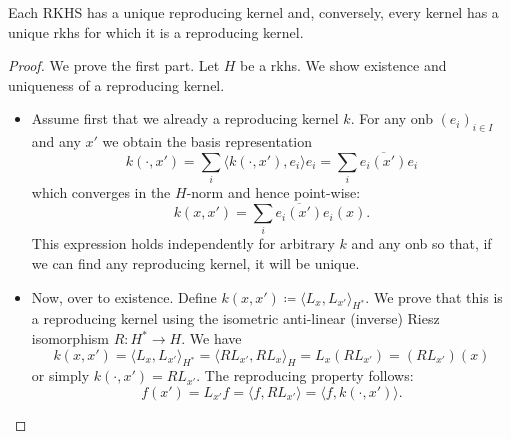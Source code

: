 \begin{thm}
    Each RKHS has a unique reproducing kernel and, conversely, 
    every kernel has a unique rkhs for which it is a reproducing
    kernel.
\end{thm}
\begin{proof}
    We prove the first part.
    Let $H$ be a rkhs.
    We show existence and uniqueness of a reproducing kernel.
    \begin{itemize}
        \item Assume first that we already a reproducing kernel $k$.
            For any onb $(e_i)_{i \in I}$ and any $x'$
            we obtain the basis representation
            \begin{equation*}
                k(\cdot,x') = \sum_i \langle k(\cdot,x'),e_i \rangle e_i
                    = \sum_i \overline{e_i(x')} e_i
            \end{equation*}
            which converges in the $H$-norm and hence point-wise:
            \begin{equation}\label{eq:kernel_onb}
                k(x,x') = \sum_i \overline{e_i(x')} e_i(x).
            \end{equation}
            This expression holds independently for arbitrary $k$ 
            and any onb so that, if we can find any reproducing kernel,
            it will be unique.
        \item Now, over to existence.
            Define $k(x,x') \coloneqq \langle L_x, L_{x'} \rangle_{H^*}$.
            We prove that this is a reproducing kernel using the 
            isometric anti-linear (inverse) Riesz isomorphism 
            $R \colon H^* \to H$.
            We have
            \begin{equation*}
                k(x,x') = \langle L_x,L_{x'} \rangle_{H^*}
                    = \langle R L_{x'}, R L_x \rangle_H
                    = L_x(R L_{x'}) = (R L_{x'})(x)
            \end{equation*}
            or simply $k(\cdot,x') = R L_{x'}$. 
            The reproducing property follows:
            \begin{equation*}
                f(x') = L_{x'} f = \langle f, R L_{x'}\rangle
                    = \langle f, k(\cdot, x') \rangle.
            \end{equation*}
    \end{itemize}


\end{proof}
